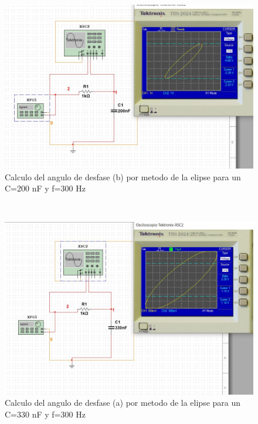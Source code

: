 \documentclass[twoside,twocolumn]{article}
\begin{document}
    \begin{figure}[h]
    \centering
    \includegraphics[scale=0.2]{Imagenes/5.4.JPG}
    \caption{Calculo del angulo de desfase (b) por metodo de la elipse para un C=200 nF y f=300 Hz}
    \label{fig:circuito1}
  \end{figure}\\  

  \begin{figure}[h]
    \centering
    \includegraphics[scale=0.2]{Imagenes/5.5.JPG}
    \caption{Calculo del angulo de desfase (a) por metodo de la elipse para un C=330 nF y f=300 Hz}
    \label{fig:circuito1}
  \end{figure}\\  
  
\newpage
  
\end{document}

